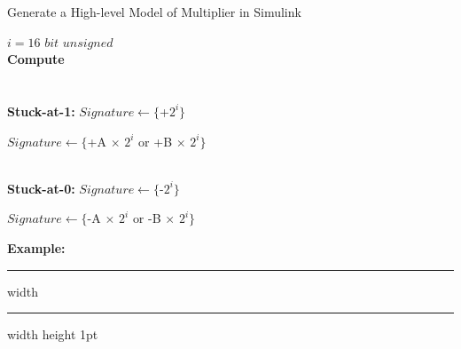\begin{algorithm}
\caption{Generate a High-level Model of  Multiplier in Simulink}
\begin{algorithmic}
\label{algo-mull}
\REQUIRE $ i = 16$  $bit$ $unsigned$ \\
\textbf{Compute}\\ 
\hspace{1.5cm}{$Original =  A $ $ \times $ $ B$ } \\
\hspace{1.5cm}{$Faulty =  A $ $ \times $ $ B$ } \\
\vspace{0.20 cm }
\textbf{Stuck-at-1:}
\vspace{0.20 cm }
\vspace{0.10 cm }
\STATE $Signature \leftarrow  \{$+$ 2^{i}\}$
\vspace{0.10 cm }
\vspace{0.20 cm }

\vspace{0.10 cm }
\STATE $Signature \leftarrow  \{$+$  $A$ $ $ \times $ $2^{i} $ $ $or$ $ $ $+$ $B$ $ $ \times $ $2^{i}\}$

\vspace{0.10 cm }
\ENDIF
\vspace{0.20 cm }
\vspace{0.20 cm }
\\
\textbf{Stuck-at-0:}
\vspace{0.20 cm }
\vspace{0.10 cm }
\STATE $Signature \leftarrow  \{$-$ 2^{i}\}$
\vspace{0.10 cm }
\vspace{0.20 cm }

\vspace{0.10 cm }
\STATE $Signature \leftarrow  \{$-$  $A$ $ $ \times $ $2^{i} $ $ $or$ $ $ $-$  $B$ $ $ \times $ $2^{i}\}$
\vspace{0.10 cm }
\ENDIF
\vspace{0.20 cm }
\end{algorithmic}
\end{algorithm}



\hspace{-0.3 cm}\textbf{Example:}
\hrule height 2pt width \hsize \kern 1pt \hrule width \hsize height 1pt

